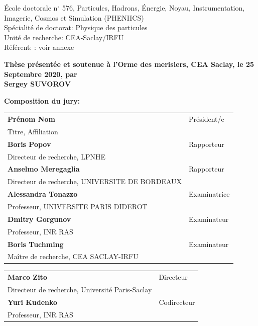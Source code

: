 \documentclass[../main.tex]{subfiles}
\begin{document}
\vspace{15mm}

École doctorale n$^{\circ}$ 576, Particules, Hadrons, Énergie, Noyau, Instrumentation,
Imagerie, Cosmos et Simulation (PHENIICS)\\
\small Spécialité de doctorat: Physique des particules\\
\footnotesize Unité de recherche: CEA-Saclay/IRFU\\
\footnotesize Référent: : voir annexe
\vspace{15mm}

\textbf{Thèse présentée et soutenue à l'Orme des merisiers, CEA Saclay, le 25 Septembre 2020, par}\\
\bigskip
\Large {\color{Prune} \textbf{Sergey SUVOROV}}


\vspace{\fill} %

\flushleft \small \textbf{Composition du jury:}
\bigskip



\scriptsize
\begin{tabular}{|p{8cm}l}
\arrayrulecolor{Prune}
\textbf{Prénom Nom} &   Président/e\\
Titre, Affiliation & \\
\textbf{Boris Popov} &   Rapporteur\\
Directeur de recherche, LPNHE & \\
\textbf{Anselmo Meregaglia} &  Rapporteur \\
Directeur de recherche, UNIVERSITE DE BORDEAUX  &   \\

\textbf{Alessandra Tonazzo} &  Examinatrice \\
Professeur, UNIVERSITE PARIS DIDEROT   &   \\
\textbf{Dmitry Gorgunov} &  Examinateur \\
Professeur, INR RAS   &   \\
\textbf{Boris Tuchming} &  Examinateur \\
Maître de recherche, CEA SACLAY-IRFU   &   \\

\end{tabular}

\medskip
\begin{tabular}{|p{8cm}l}\arrayrulecolor{white}
\textbf{Marco Zito} &   Directeur\\
Directeur de recherche, Université Paris-Saclay & \\
\textbf{Yuri Kudenko} &   Codirecteur\\
Professeur, INR RAS  &   \\


\end{tabular}
\end{document}
